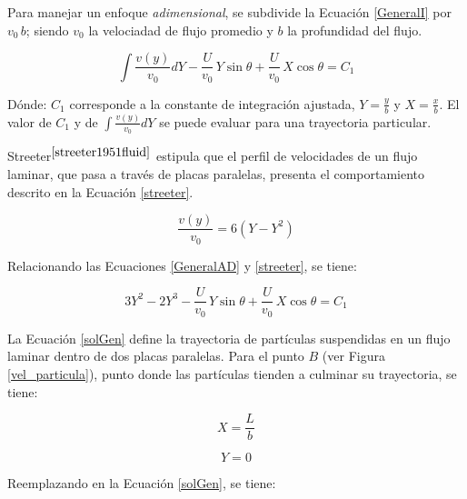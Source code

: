 \noindent
\justify

Para manejar un enfoque \textit{adimensional}, se subdivide la Ecuaci\'on \ref{GeneralI} por $v_0 \, b$; siendo $v_0$ la velociadad de flujo promedio y $b$ la profundidad del flujo.

\begin{equation}
	\int \frac{v (y)}{v_0} dY - \frac{U}{v_0} \, Y \sin \theta + \frac{U}{v_0} \, X \cos \theta = C_1
	\label{GeneralAD}
\end{equation}

\noindent
\justify

D\'onde: $C_1$ corresponde a la constante de integraci\'on ajustada, $Y = \frac{y}{b}$ y $X = \frac{x}{b}$. El valor de $C_1$ y de $\int \frac{v (y)}{v_0} dY$ se puede evaluar para una trayectoria particular.

\noindent
\justify

Streeter$^{\cite{streeter1951fluid}}$ estipula que el perfil de velocidades de un flujo laminar, que pasa a trav\'es de placas paralelas, presenta el comportamiento descrito en la Ecuaci\'on \ref{streeter}.

\begin{equation}
	\frac{v (y)}{v_0} = 6 \left(Y - Y^2 \right)
	\label{streeter}
\end{equation}

\noindent
\justify

Relacionando las Ecuaciones \ref{GeneralAD} y \ref{streeter}, se tiene:

\begin{equation}
	3 Y ^2 - 2 Y ^3 - \frac{U}{v_0} \, Y \sin \theta + \frac{U}{v_0} \, X \cos \theta = C_1
	\label{solGen} 
\end{equation}

\noindent
\justify

La Ecuaci\'on \ref{solGen} define la trayectoria de part\'iculas suspendidas en un flujo laminar dentro de dos placas paralelas. Para el punto $B$ (ver Figura \ref{vel_particula}), punto donde las part\'iculas tienden a culminar su trayectoria, se tiene:

\begin{equation*}
	X = \frac{L}{b}
\end{equation*}

\begin{equation*}
	Y = 0
\end{equation*}

Reemplazando en la Ecuaci\'on \ref{solGen}, se tiene:

